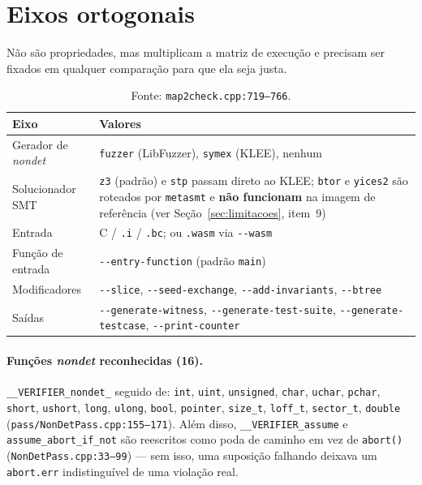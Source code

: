 \documentclass[11pt,a4paper]{article}
\newcommand{\code}[1]{\texttt{#1}}
\newcommand{\flag}[1]{\texttt{-\/-#1}}
\newcommand{\src}[1]{{\small\texttt{#1}}}
\begin{document}
\section{Eixos ortogonais}

Não são propriedades, mas multiplicam a matriz de execução e precisam ser
fixados em qualquer comparação para que ela seja justa.

\begin{table}[H]
\centering
\small
\begin{tabularx}{\textwidth}{@{}L{4.4cm} Y@{}}
\toprule
\textbf{Eixo} & \textbf{Valores} \\
\midrule
Gerador de \emph{nondet} & \code{fuzzer} (LibFuzzer), \code{symex} (KLEE), nenhum \\
Solucionador SMT & \code{z3} (padrão) e \code{stp} passam direto ao KLEE;
\code{btor} e \code{yices2} são roteados por \code{metasmt} e \textbf{não
funcionam} na imagem de referência (ver Seção~\ref{sec:limitacoes}, item~9) \\
Entrada & C / \code{.i} / \code{.bc}; ou \code{.wasm} via \flag{wasm} \\
Função de entrada & \flag{entry-function} (padrão \code{main}) \\
Modificadores & \flag{slice}, \flag{seed-exchange}, \flag{add-invariants}, \flag{btree} \\
Saídas & \flag{generate-witness}, \flag{generate-test-suite}, \flag{generate-testcase}, \flag{print-counter} \\
\bottomrule
\end{tabularx}
\caption{Fonte: \src{map2check.cpp:719--766}.}
\end{table}

\paragraph{Funções \emph{nondet} reconhecidas (16).}
\code{\_\_VERIFIER\_nondet\_} seguido de:
\code{int}, \code{uint}, \code{unsigned}, \code{char}, \code{uchar},
\code{pchar}, \code{short}, \code{ushort}, \code{long}, \code{ulong},
\code{bool}, \code{pointer}, \code{size\_t}, \code{loff\_t},
\code{sector\_t}, \code{double}
(\src{pass/NonDetPass.cpp:155--171}). Além disso,
\code{\_\_VERIFIER\_assume} e \code{assume\_abort\_if\_not} são reescritos como
poda de caminho em vez de \code{abort()}
(\src{NonDetPass.cpp:33--99}) --- sem isso, uma suposição falhando deixava um
\code{abort.err} indistinguível de uma violação real.
\end{document}
